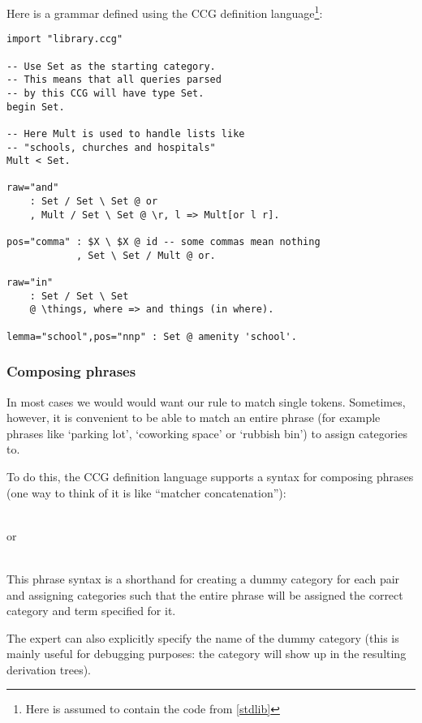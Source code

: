 \documentclass[main.tex]{subfiles}
\begin{document}
\begin{exampleenv}
Here is a grammar defined using the CCG definition language\footnote{
    Here  is assumed to contain the code from \cref{stdlib}
}:
\begin{lstlisting}
import "library.ccg"

-- Use Set as the starting category.
-- This means that all queries parsed
-- by this CCG will have type Set.
begin Set.

-- Here Mult is used to handle lists like
-- "schools, churches and hospitals"
Mult < Set.

raw="and"
    : Set / Set \ Set @ or
    , Mult / Set \ Set @ \r, l => Mult[or l r].

pos="comma" : $X \ $X @ id -- some commas mean nothing
            , Set \ Set / Mult @ or.

raw="in"
    : Set / Set \ Set
    @ \things, where => and things (in where).

lemma="school",pos="nnp" : Set @ amenity 'school'.
\end{lstlisting}
\end{exampleenv}

\subsubsection{Composing phrases}
In most cases we would would want our rule to match single tokens. Sometimes,
however, it is convenient to be able to match an entire phrase (for example
phrases like `parking lot', `coworking space' or `rubbish bin') to assign
categories to.

To do this, the CCG definition language supports a syntax for composing phrases
(one way to think of it is like ``matcher concatenation''):
\begin{center}
     \code{<>}  \\
    or \\
       \\
\end{center}
This phrase syntax is a shorthand for creating a dummy category
for each pair and assigning categories such that the entire phrase will
be assigned the correct category and term specified for it.

The expert can also explicitly specify the name of the dummy category
(this is mainly useful for debugging purposes: the category will show up
in the resulting derivation trees).
\end{document}
